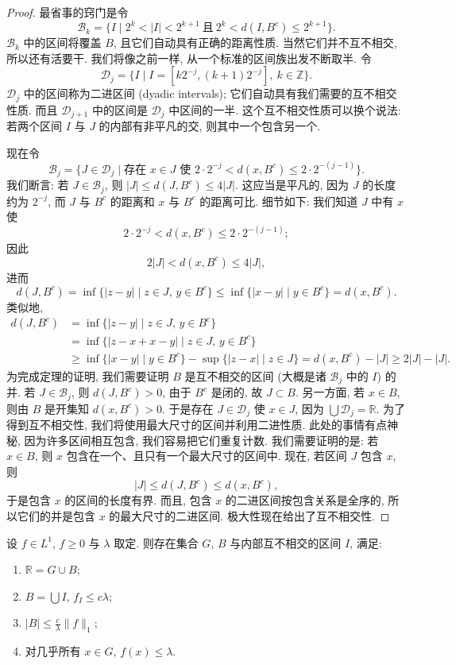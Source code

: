 \begin{proof}
最省事的窍门是令
\[
\mathcal{B}_{k}=\{I \mid 2^{k}<|I|<2^{k+1}\ \text{且}\ 2^{k}<d(I,B^{c})\leq 2^{k+1}\}.
\]
$\mathcal{B}_{k}$ 中的区间将覆盖 $B$, 且它们自动具有正确的距离性质. 当然它们并不互不相交, 所以还有活要干. 我们将像之前一样, 从一个标准的区间族出发不断取半. 令
\[
\mathcal{D}_{j}=\{I \mid I=[k2^{-j},(k+1)2^{-j}],\ k\in\mathbb{Z}\}.
\]
$\mathcal{D}_j$ 中的区间称为二进区间 (dyadic intervals); 它们自动具有我们需要的互不相交性质. 而且 $\mathcal{D}_{j+1}$ 中的区间是 $\mathcal{D}_j$ 中区间的一半. 这个互不相交性质可以换个说法: 若两个区间 $I$ 与 $J$ 的内部有非平凡的交, 则其中一个包含另一个.

现在令
\[
\mathcal{B}_{j}=\{J\in\mathcal{D}_{j} \mid \text{存在 } x\in J \text{ 使 } 2\cdot 2^{-j}<d(x,B^{c})\leq 2\cdot 2^{-(j-1)}\}.
\]
我们断言: 若 $J\in\mathcal{B}_{j}$, 则 $|J|\leq d(J,B^{c})\leq 4|J|$. 这应当是平凡的, 因为 $J$ 的长度约为 $2^{-j}$, 而 $J$ 与 $B^c$ 的距离和 $x$ 与 $B^c$ 的距离可比. 细节如下: 我们知道 $J$ 中有 $x$ 使
\[
2\cdot 2^{-j}<d(x,B^{c})\leq 2\cdot 2^{-(j-1)};
\]
因此
\[
2\left|J\right|<d(x,B^{c})\leq 4\left|J\right|,
\]
进而
\[
d(J,B^{c})=\inf\{|z-y| \mid z\in J,\,y\in B^{c}\}
\leq\inf\{|x-y| \mid y\in B^{c}\}=d(x,B^{c}).
\]
类似地,
\begin{align*}
d(J,B^{c})&=\inf\{|z-y| \mid z\in J,\,y\in B^{c}\} \\
&=\inf\{|z-x+x-y| \mid z\in J,\,y\in B^{c}\} \\
&\geq\inf\{|x-y| \mid y\in B^{c}\}-\sup\{|z-x| \mid z\in J\}
=d(x,B^{c})-|J|\geq 2|J|-|J|.
\end{align*}
为完成定理的证明, 我们需要证明 $B$ 是互不相交的区间 (大概是诸 $\mathcal{B}_j$ 中的 $I$) 的并. 若 $J\in\mathcal{B}_j$, 则 $d(J,B^c)>0$, 由于 $B^c$ 是闭的, 故 $J\subset B$. 另一方面, 若 $x\in B$, 则由 $B$ 是开集知 $d(x,B^c)>0$. 于是存在 $J\in\mathcal{D}_j$ 使 $x\in J$, 因为 $\bigcup\mathcal{D}_j=\mathbb{R}$. 为了得到互不相交性, 我们将使用最大尺寸的区间并利用二进性质. 此处的事情有点神秘, 因为许多区间相互包含, 我们容易把它们重复计数. 我们需要证明的是: 若 $x\in B$, 则 $x$ 包含在一个、且只有一个最大尺寸的区间中. 现在, 若区间 $J$ 包含 $x$, 则
\[
|J|\leq d(J,B^{c})\leq d(x,B^{c}),
\]
于是包含 $x$ 的区间的长度有界. 而且, 包含 $x$ 的二进区间按包含关系是全序的, 所以它们的并是包含 $x$ 的最大尺寸的二进区间. 极大性现在给出了互不相交性.
\end{proof}

\begin{corollary}\label{cor:2.31}
设 $f\in L^1$, $f\geq 0$ 与 $\lambda$ 取定. 则存在集合 $G$, $B$ 与内部互不相交的区间 $I$, 满足:
\begin{enumerate}[label=\arabic*)]
\item $\mathbb{R}=G\cup B$;
\item $B=\bigcup I$, $f_I\leq c\lambda$;
\item $|B|\leq\frac{c}{\lambda}\|f\|_1$;
\item 对几乎所有 $x\in G$, $f(x)\leq\lambda$.
\end{enumerate}
\end{corollary}

